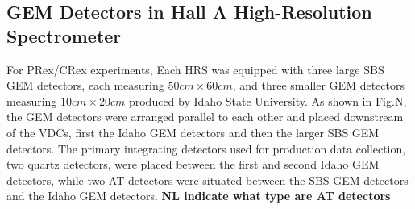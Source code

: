 \subsection{GEM Detectors in Hall A High-Resolution Spectrometer}

For PRex/CRex experiments, Each HRS was  equipped with three large SBS GEM detectors, each measuring $50 cm \times 60 cm$, and three smaller GEM detectors measuring $10 cm \times 20 cm$ produced by Idaho State University. As shown  in  Fig.N, the GEM detectors were arranged parallel to each other and placed downstream of  the VDCs, first the Idaho GEM detectors and then  the larger SBS GEM detectors. The primary integrating detectors used for production data collection, two quartz detectors,  were placed between the first and second Idaho GEM detectors, while two AT detectors were situated between the SBS GEM detectors and the Idaho GEM detectors. {\bf NL indicate what type are AT detectors}


